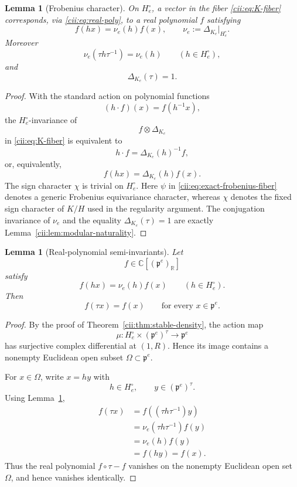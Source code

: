 \documentclass[10pt,a4paper]{amsart}
\numberwithin{equation}{section}
\newtheorem{lemma}[theorem]{Lemma}
\newcommand{\C}{\mathbb C}
\newcommand{\R}{\mathbb R}
\begin{document}
\begin{lemma}[Frobenius character]
\label{cii:lem:frobenius-character}
On \(H_e^\circ\), a vector in the fiber
\eqref{cii:eq:K-fiber} corresponds, via \eqref{cii:eq:real-poly}, to a real polynomial \(f\) satisfying
\[
f(hx)=\nu_e(h)f(x),
\qquad
\nu_e:=\Delta_{K_e}|_{H_e^\circ}.
\]
Moreover
\[
\nu_e(\tau h\tau^{-1})=\nu_e(h)
\qquad(h\in H_e^\circ),
\]
and
\[
\Delta_{K_e}(\tau)=1.
\]
\end{lemma}

\begin{proof}
With the standard action on polynomial functions
\[
(h\cdot f)(x)=f(h^{-1}x),
\]
the \(H_e^\circ\)-invariance of
\[
f\otimes\Delta_{K_e}
\]
in \eqref{cii:eq:K-fiber} is equivalent to
\[
h\cdot f=\Delta_{K_e}(h)^{-1}f,
\]
or, equivalently,
\[
f(hx)=\Delta_{K_e}(h)f(x).
\]
The sign character $\chi$ is trivial on \(H_e^\circ\).  Here $\psi$ in
\eqref{cii:eq:exact-frobenius-fiber} denotes a generic Frobenius
equivariance character, whereas $\chi$ denotes the fixed sign character of
$K/H$ used in the regularity argument.
The conjugation invariance of \(\nu_e\) and the equality
\(\Delta_{K_e}(\tau)=1\) are exactly
Lemma~\ref{cii:lem:modular-naturality}.
\end{proof}

\begin{lemma}[Real-polynomial semi-invariants]
\label{cii:lem:real-semiinvariant}
Let
\[
f\in\C[(\mathfrak p^e)_{\R}]
\]
satisfy
\[
f(hx)=\nu_e(h)f(x)
\qquad(h\in H_e^\circ).
\]
Then
\[
f(\tau x)=f(x)
\qquad
\text{for every }x\in\mathfrak p^e.
\]
\end{lemma}

\begin{proof}
By the proof of Theorem~\ref{cii:thm:stable-density}, the action map
\[
\mu:
H_e^\circ\times(\mathfrak p^e)^\tau
\longrightarrow
\mathfrak p^e
\]
has surjective complex differential at \((1,R)\).  Hence its image contains
a nonempty Euclidean open subset
\(\Omega\subset\mathfrak p^e\).

For \(x\in\Omega\), write \(x=hy\) with
\[
h\in H_e^\circ,\qquad
y\in(\mathfrak p^e)^\tau.
\]
Using Lemma~\ref{cii:lem:frobenius-character},
\[
\begin{aligned}
f(\tau x)
&=f((\tau h\tau^{-1})y)\\
&=\nu_e(\tau h\tau^{-1})f(y)\\
&=\nu_e(h)f(y)\\
&=f(hy)=f(x).
\end{aligned}
\]
Thus the real polynomial \(f\circ\tau-f\) vanishes on the nonempty
Euclidean open set \(\Omega\), and hence vanishes identically.
\end{proof}
\end{document}
